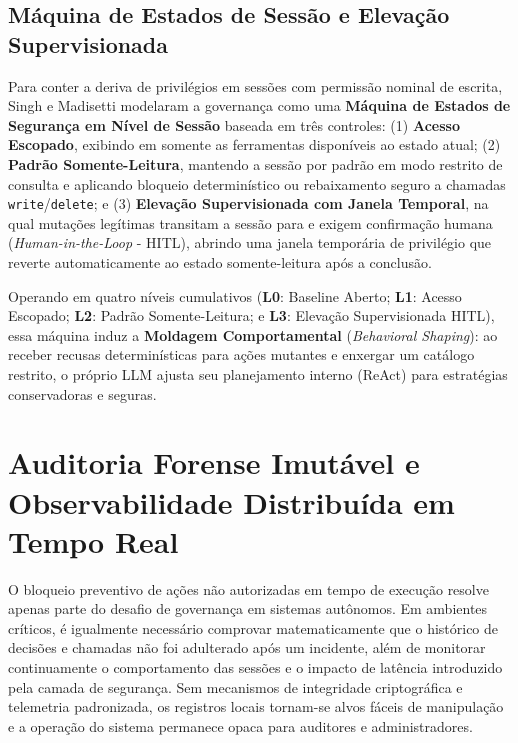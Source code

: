 \subsection{Máquina de Estados de Sessão e Elevação Supervisionada}
\label{subsec:maquina_estados_hitl}

Para conter a deriva de privilégios em sessões com permissão nominal de escrita, Singh e Madisetti \cite{singh2026mcpsecure} modelaram a governança como uma \textbf{Máquina de Estados de Segurança em Nível de Sessão} baseada em três controles: (1) \textbf{Acesso Escopado}, exibindo em  somente as ferramentas disponíveis ao estado atual; (2) \textbf{Padrão Somente-Leitura}, mantendo a sessão por padrão em modo restrito de consulta e aplicando bloqueio determinístico ou rebaixamento seguro a chamadas \texttt{write}/\texttt{delete}; e (3) \textbf{Elevação Supervisionada com Janela Temporal}, na qual mutações legítimas transitam a sessão para  e exigem confirmação humana (\textit{Human-in-the-Loop} - HITL), abrindo uma janela temporária de privilégio que reverte automaticamente ao estado somente-leitura após a conclusão.

Operando em quatro níveis cumulativos (\textbf{L0}: Baseline Aberto; \textbf{L1}: Acesso Escopado; \textbf{L2}: Padrão Somente-Leitura; e \textbf{L3}: Elevação Supervisionada HITL), essa máquina induz a \textbf{Moldagem Comportamental} (\textit{Behavioral Shaping}): ao receber recusas determinísticas para ações mutantes e enxergar um catálogo restrito, o próprio LLM ajusta seu planejamento interno (ReAct) para estratégias conservadoras e seguras.

\section{Auditoria Forense Imutável e Observabilidade Distribuída em Tempo Real}
\label{sec:auditoria_observabilidade}

O bloqueio preventivo de ações não autorizadas em tempo de execução resolve apenas parte do desafio de governança em sistemas autônomos. Em ambientes críticos, é igualmente necessário comprovar matematicamente que o histórico de decisões e chamadas não foi adulterado após um incidente, além de monitorar continuamente o comportamento das sessões e o impacto de latência introduzido pela camada de segurança. Sem mecanismos de integridade criptográfica e telemetria padronizada, os registros locais tornam-se alvos fáceis de manipulação e a operação do sistema permanece opaca para auditores e administradores.

